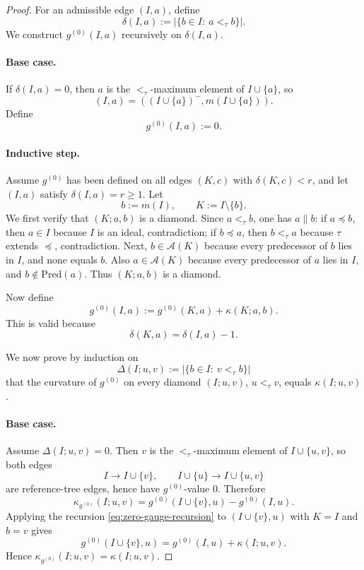 \documentclass{article}
\theoremstyle{definition}
\begin{document}
\begin{proof}
For an admissible edge \((I,a)\), define
\begin{equation}
\delta(I,a):=\bigl|\{b\in I:\ a<_{\tau} b\}\bigr|.
\label{eq:delta-recursion}
\end{equation}
We construct \(g^{(0)}(I,a)\) recursively on \(\delta(I,a)\).

\paragraph{Base case.}
If \(\delta(I,a)=0\), then \(a\) is the \(<_{\tau}\)-maximum element of \(I\cup\{a\}\), so
\[
(I,a)=((I\cup\{a\})^-,m(I\cup\{a\})).
\]
Define
\begin{equation}
g^{(0)}(I,a):=0.
\label{eq:zero-gauge-base}
\end{equation}

\paragraph{Inductive step.}
Assume \(g^{(0)}\) has been defined on all edges \((K,c)\) with \(\delta(K,c)<r\), and let \((I,a)\) satisfy \(\delta(I,a)=r\ge 1\). Let
\[
b:=m(I),\qquad K:=I\setminus\{b\}.
\]
We first verify that \((K;a,b)\) is a diamond. Since \(a<_{\tau}b\), one has \(a\parallel b\): if \(a\preceq b\), then \(a\in I\) because \(I\) is an ideal, contradiction; if \(b\preceq a\), then \(b<_{\tau}a\) because \(\tau\) extends \(\preceq\), contradiction. Next, \(b\in \mathcal A(K)\) because every predecessor of \(b\) lies in \(I\), and none equals \(b\). Also \(a\in \mathcal A(K)\) because every predecessor of \(a\) lies in \(I\), and \(b\notin \mathrm{Pred}(a)\). Thus \((K;a,b)\) is a diamond.

Now define
\begin{equation}
g^{(0)}(I,a):=g^{(0)}(K,a)+\kappa(K;a,b).
\label{eq:zero-gauge-recursion}
\end{equation}
This is valid because
\[
\delta(K,a)=\delta(I,a)-1.
\]

We now prove by induction on
\[
\Delta(I;u,v):=\bigl|\{b\in I:\ v<_{\tau} b\}\bigr|
\]
that the curvature of \(g^{(0)}\) on every diamond \((I;u,v)\), \(u<_{\tau}v\), equals \(\kappa(I;u,v)\).

\paragraph{Base case.}
Assume \(\Delta(I;u,v)=0\). Then \(v\) is the \(<_{\tau}\)-maximum element of \(I\cup\{u,v\}\), so both edges
\[
I\to I\cup\{v\},
\qquad
I\cup\{u\}\to I\cup\{u,v\}
\]
are reference-tree edges, hence have \(g^{(0)}\)-value \(0\). Therefore
\[
\kappa_{g^{(0)}}(I;u,v)=g^{(0)}(I\cup\{v\},u)-g^{(0)}(I,u).
\]
Applying the recursion \eqref{eq:zero-gauge-recursion} to \((I\cup\{v\},u)\) with \(K=I\) and \(b=v\) gives
\[
g^{(0)}(I\cup\{v\},u)=g^{(0)}(I,u)+\kappa(I;u,v).
\]
Hence \(\kappa_{g^{(0)}}(I;u,v)=\kappa(I;u,v)\).


\end{proof}
\end{document}

